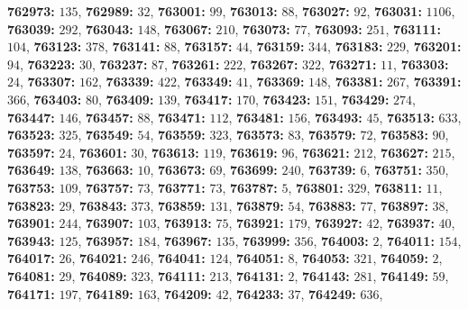\textsf{\bfseries 762973:} $135$, \textsf{\bfseries 762989:} $32$, \textsf{\bfseries 763001:} $99$, \textsf{\bfseries 763013:} $88$, \textsf{\bfseries 763027:} $92$, \textsf{\bfseries 763031:} $1106$, \textsf{\bfseries 763039:} $292$, \textsf{\bfseries 763043:} $148$, \textsf{\bfseries 763067:} $210$, \textsf{\bfseries 763073:} $77$, \textsf{\bfseries 763093:} $251$, \textsf{\bfseries 763111:} $104$, \textsf{\bfseries 763123:} $378$, \textsf{\bfseries 763141:} $88$, \textsf{\bfseries 763157:} $44$, \textsf{\bfseries 763159:} $344$, \textsf{\bfseries 763183:} $229$, \textsf{\bfseries 763201:} $94$, \textsf{\bfseries 763223:} $30$, \textsf{\bfseries 763237:} $87$, \textsf{\bfseries 763261:} $222$, \textsf{\bfseries 763267:} $322$, \textsf{\bfseries 763271:} $11$, \textsf{\bfseries 763303:} $24$, \textsf{\bfseries 763307:} $162$, \textsf{\bfseries 763339:} $422$, \textsf{\bfseries 763349:} $41$, \textsf{\bfseries 763369:} $148$, \textsf{\bfseries 763381:} $267$, \textsf{\bfseries 763391:} $366$, \textsf{\bfseries 763403:} $80$, \textsf{\bfseries 763409:} $139$, \textsf{\bfseries 763417:} $170$, \textsf{\bfseries 763423:} $151$, \textsf{\bfseries 763429:} $274$, \textsf{\bfseries 763447:} $146$, \textsf{\bfseries 763457:} $88$, \textsf{\bfseries 763471:} $112$, \textsf{\bfseries 763481:} $156$, \textsf{\bfseries 763493:} $45$, \textsf{\bfseries 763513:} $633$, \textsf{\bfseries 763523:} $325$, \textsf{\bfseries 763549:} $54$, \textsf{\bfseries 763559:} $323$, \textsf{\bfseries 763573:} $83$, \textsf{\bfseries 763579:} $72$, \textsf{\bfseries 763583:} $90$, \textsf{\bfseries 763597:} $24$, \textsf{\bfseries 763601:} $30$, \textsf{\bfseries 763613:} $119$, \textsf{\bfseries 763619:} $96$, \textsf{\bfseries 763621:} $212$, \textsf{\bfseries 763627:} $215$, \textsf{\bfseries 763649:} $138$, \textsf{\bfseries 763663:} $10$, \textsf{\bfseries 763673:} $69$, \textsf{\bfseries 763699:} $240$, \textsf{\bfseries 763739:} $6$, \textsf{\bfseries 763751:} $350$, \textsf{\bfseries 763753:} $109$, \textsf{\bfseries 763757:} $73$, \textsf{\bfseries 763771:} $73$, \textsf{\bfseries 763787:} $5$, \textsf{\bfseries 763801:} $329$, \textsf{\bfseries 763811:} $11$, \textsf{\bfseries 763823:} $29$, \textsf{\bfseries 763843:} $373$, \textsf{\bfseries 763859:} $131$, \textsf{\bfseries 763879:} $54$, \textsf{\bfseries 763883:} $77$, \textsf{\bfseries 763897:} $38$, \textsf{\bfseries 763901:} $244$, \textsf{\bfseries 763907:} $103$, \textsf{\bfseries 763913:} $75$, \textsf{\bfseries 763921:} $179$, \textsf{\bfseries 763927:} $42$, \textsf{\bfseries 763937:} $40$, \textsf{\bfseries 763943:} $125$, \textsf{\bfseries 763957:} $184$, \textsf{\bfseries 763967:} $135$, \textsf{\bfseries 763999:} $356$, \textsf{\bfseries 764003:} $2$, \textsf{\bfseries 764011:} $154$, \textsf{\bfseries 764017:} $26$, \textsf{\bfseries 764021:} $246$, \textsf{\bfseries 764041:} $124$, \textsf{\bfseries 764051:} $8$, \textsf{\bfseries 764053:} $321$, \textsf{\bfseries 764059:} $2$, \textsf{\bfseries 764081:} $29$, \textsf{\bfseries 764089:} $323$, \textsf{\bfseries 764111:} $213$, \textsf{\bfseries 764131:} $2$, \textsf{\bfseries 764143:} $281$, \textsf{\bfseries 764149:} $59$, \textsf{\bfseries 764171:} $197$, \textsf{\bfseries 764189:} $163$, \textsf{\bfseries 764209:} $42$, \textsf{\bfseries 764233:} $37$, \textsf{\bfseries 764249:} $636$, 
